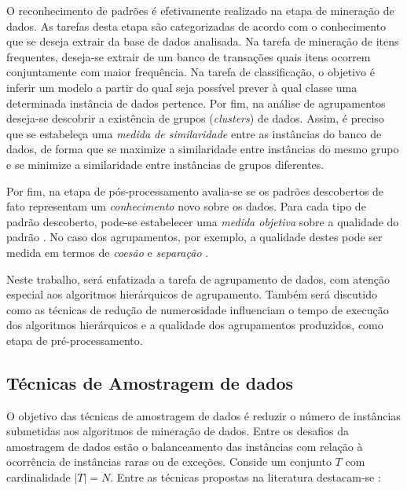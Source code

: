 O reconhecimento de padrões é efetivamente realizado na etapa de mineração de
dados. As tarefas desta etapa são categorizadas de acordo com o conhecimento que
se deseja extrair da base de dados analisada. Na tarefa de mineração de itens
frequentes, deseja-se extrair de um banco de transações quais itens ocorrem
conjuntamente com maior frequência. Na tarefa de classificação, o objetivo é
inferir um modelo a partir do qual seja possível prever à qual classe uma
determinada instância de dados pertence. Por fim, na análise de agrupamentos
deseja-se descobrir a existência de grupos (\emph{clusters}) de dados. Assim, é
preciso que se estabeleça uma \emph{medida de similaridade} entre as instâncias
do banco de dados, de forma que se maximize a similaridade entre instâncias do
mesmo grupo e se minimize a similaridade entre instâncias de grupos diferentes.

Por fim, na etapa de pós-processamento avalia-se se os padrões descobertos de
fato representam um \emph{conhecimento} novo sobre os dados. Para cada tipo
de padrão descoberto, pode-se estabelecer uma \emph{medida objetiva} sobre a
qualidade do padrão \cite{han2011data}. No caso dos agrupamentos, por exemplo,
a qualidade destes pode ser medida em termos de \emph{coesão} e \emph{separação}
\cite{tan2009introducao}.

Neste trabalho, será enfatizada a tarefa de agrupamento de dados, com atenção especial aos algoritmos hierárquicos de agrupamento. Também será discutido como as técnicas de redução de numerosidade influenciam o tempo de execução dos algoritmos hierárquicos e a qualidade dos agrupamentos produzidos, como etapa de pré-processamento.


\subsection{Técnicas de Amostragem de dados}
	\label{subsec:amostragem}
	
O objetivo das técnicas de amostragem de dados é reduzir o número de instâncias submetidas aos algoritmos de mineração de dados. Entre os desafios da amostragem de dados estão o balanceamento das instâncias com relação à ocorrência de instâncias raras ou de exceções.
Conside um conjunto $T$ com cardinalidade $|T| = N$. Entre as técnicas propostas na literatura destacam-se \cite{Garcia2015}:

